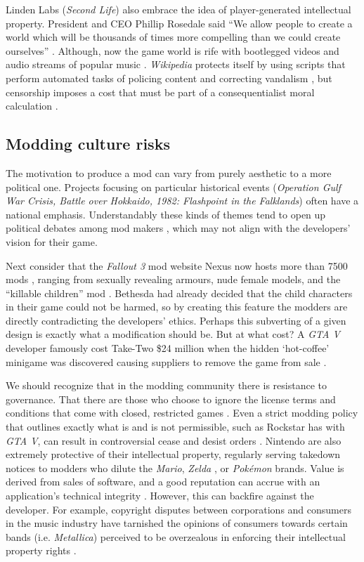 \documentclass{scrartcl}
\begin{document}
Linden Labs (\textit{Second Life}) also embrace the idea of player-generated intellectual property. President and CEO Phillip Rosedale said ``We allow people to create a world which will be thousands of times more compelling than we could create ourselves'' \cite{herman2006your}. Although, now the game world is rife with bootlegged videos and audio streams of popular music \cite{herman2006your}. \textit{Wikipedia} protects itself by using scripts that perform automated tasks of policing content and correcting vandalism \cite{hong2014becoming}, but censorship imposes a cost that must be part of a consequentialist moral calculation \cite{schulzke2010defending}.

\subsection*{Modding culture risks}

The motivation to produce a mod can vary from purely aesthetic to a more political one. Projects focusing on particular historical events (\textit{Operation Gulf War Crisis, Battle over Hokkaido, 1982: Flashpoint in the Falklands}) often have a national emphasis. Understandably these kinds of themes tend to open up political debates among mod makers \cite{sotamaa2010game}, which may not align with the developers' vision for their game.

Next consider that the \textit{Fallout 3} mod website Nexus now hosts more than 7500 mods \cite{bostan2010explorations}, ranging from sexually revealing armours, nude female models, and the ``killable children'' mod \cite{bostan2010explorations}. Bethesda had already decided that the child characters in their game could not be harmed, so by creating this feature the modders are directly contradicting the developers' ethics. Perhaps this subverting of a given design is exactly what a modification should be. But at what cost? A \textit{GTA V} developer famously cost Take-Two {\$}24 million when the hidden `hot-coffee' minigame was discovered causing suppliers to remove the game from sale \cite{hotcoffee1}.

We should recognize that in the modding community there is resistance to governance. That there are those who choose to ignore the license terms and conditions that come with closed, restricted games \cite{scacchi2010computer}. Even a strict modding policy that outlines exactly what is and is not permissible, such as Rockstar has with \textit{GTA V}, can result in controversial cease and desist orders \cite{gta1}. Nintendo are also extremely protective of their intellectual property, regularly serving takedown notices to modders who dilute the \textit{Mario}, \textit{Zelda} \cite{nintendo1}, or \textit{Pok{\'e}mon} \cite{pokemon1} brands. Value is derived from sales of software, and a good reputation can accrue with an application's technical integrity \cite{herman2006your}. However, this can backfire against the developer. For example, copyright disputes between corporations and consumers in the music industry have tarnished the opinions of consumers towards certain bands (i.e. \textit{Metallica}) perceived to be overzealous in enforcing their intellectual property rights \cite{herman2006your}. 
\end{document}

